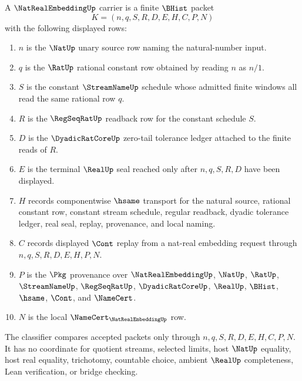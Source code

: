 \begin{definition}
\label{def:nat-real-embedding-carrier}
A $\NatRealEmbeddingUp$ carrier is a finite $\BHist$ packet
$$
K=(n,q,S,R,D,E,H,C,P,N)
$$
with the following displayed rows:
\begin{enumerate}
\item $n$ is the $\NatUp$ unary source row naming the natural-number input.
\item $q$ is the $\RatUp$ rational constant row obtained by reading $n$ as $n/1$.
\item $S$ is the constant $\StreamNameUp$ schedule whose admitted finite windows all read the same rational row $q$.
\item $R$ is the $\RegSeqRatUp$ readback row for the constant schedule $S$.
\item $D$ is the $\DyadicRatCoreUp$ zero-tail tolerance ledger attached to the finite reads of $R$.
\item $E$ is the terminal $\RealUp$ seal reached only after $n,q,S,R,D$ have been displayed.
\item $H$ records componentwise $\hsame$ transport for the natural source, rational constant row, constant stream schedule, regular readback, dyadic tolerance ledger, real seal, replay, provenance, and local naming.
\item $C$ records displayed $\Cont$ replay from a nat-real embedding request through $n,q,S,R,D,E,H,P,N$.
\item $P$ is the $\Pkg$ provenance over $\NatRealEmbeddingUp$, $\NatUp$, $\RatUp$, $\StreamNameUp$, $\RegSeqRatUp$, $\DyadicRatCoreUp$, $\RealUp$, $\BHist$, $\hsame$, $\Cont$, and $\NameCert$.
\item $N$ is the local $\NameCert_{\NatRealEmbeddingUp}$ row.
\end{enumerate}
The classifier compares accepted packets only through $n,q,S,R,D,E,H,C,P,N$. It has no coordinate for quotient streams, selected limits, host $\NatUp$ equality, host real equality, trichotomy, countable choice, ambient $\RealUp$ completeness, Lean verification, or bridge checking.
\end{definition}

